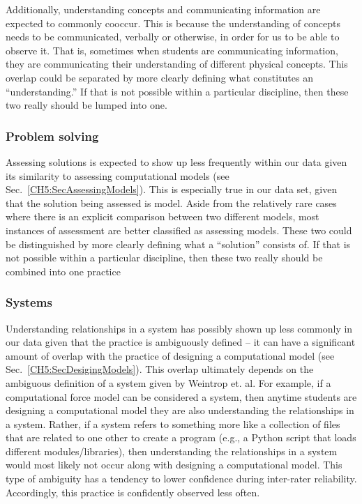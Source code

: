 \documentclass{msuphddissertation}
\begin{document}
\begin{doublespace}
Additionally, understanding concepts and communicating information are expected to commonly cooccur.  This is because the understanding of concepts needs to be communicated, verbally or otherwise, in order for us to be able to observe it.  That is, sometimes when students are communicating information, they are communicating their understanding of different physical concepts.  This overlap could be separated by more clearly defining what constitutes an ``understanding.''  If that is not possible within a particular discipline, then these two really should be lumped into one.

\subsubsection{Problem solving}

Assessing solutions is expected to show up less frequently within our data given its similarity to assessing computational models (see Sec.~\ref{CH5:SecAssessingModels}).  This is especially true in our data set, given that the solution being assessed is model.  Aside from the relatively rare cases where there is an explicit comparison between two different models, most instances of assessment are better classified as assessing models.  These two could be distinguished by more clearly defining what a ``solution'' consists of.  If that is not possible within a particular discipline, then these two really should be combined into one practice

\subsubsection{Systems}

Understanding relationships in a system has possibly shown up less commonly in our data given that the practice is ambiguously defined -- it can have a significant amount of overlap with the practice of designing a computational model (see Sec.~\ref{CH5:SecDesigingModels}).  This overlap ultimately depends on the ambiguous definition of a system given by Weintrop et. al.  For example, if a computational force model can be considered a system, then anytime students are designing a computational model they are also understanding the relationships in a system.  Rather, if a system refers to something more like a collection of files that are related to one other to create a program (e.g., a Python script that loads different modules/libraries), then understanding the relationships in a system would most likely not occur along with designing a computational model.  This type of ambiguity has a tendency to lower confidence during inter-rater reliability.  Accordingly, this practice is confidently observed less often.


\end{doublespace}
\end{document}
